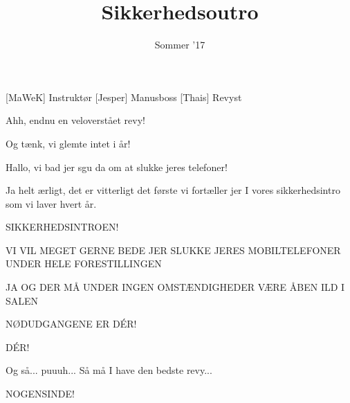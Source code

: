 \documentclass[a4paper,11pt]{article}
\title{Sikkerhedsoutro}
\author{Sommer '17}
\begin{document}
\maketitle

\begin{roles}
[MaWeK] Instruktør
[Jesper] Manusboss
[Thais] Revyst
\end{roles}



\begin{sketch}


 Ahh, endnu en veloverstået revy!

 Og tænk, vi glemte intet i år!


 Hallo, vi bad jer sgu da om at slukke jeres telefoner!

 Ja helt ærligt, det er vitterligt det første vi fortæller jer I vores sikkerhedsintro som vi laver hvert år.


 SIKKERHEDSINTROEN!

 VI VIL MEGET GERNE BEDE JER SLUKKE JERES MOBILTELEFONER UNDER HELE FORESTILLINGEN

 JA OG DER MÅ UNDER INGEN OMSTÆNDIGHEDER VÆRE ÅBEN ILD I SALEN

 NØDUDGANGENE ER DÉR!

 DÉR!


  Og så... puuuh... Så må I have den bedste revy...

  NOGENSINDE!

\end{sketch}
\end{document}
